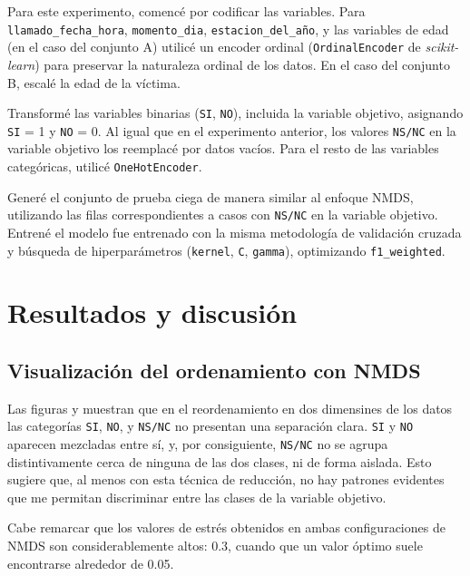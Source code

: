 \documentclass[10 pt]{article}
\begin{document}
Para este experimento, comencé por codificar las variables. Para \texttt{llamado\_fecha\_hora}, \texttt{momento\_dia}, \texttt{estacion\_del\_año}, y las variables de edad (en el caso del conjunto A) utilicé un encoder ordinal (\texttt{OrdinalEncoder} de \textit{scikit-learn}\citetext{\citealp{scikit-learn}}) para preservar la naturaleza ordinal de los datos. En el caso del conjunto B, escalé la edad de la víctima.

Transformé las variables binarias (\texttt{SI}, \texttt{NO}), incluida la variable objetivo, asignando \texttt{SI} = 1 y \texttt{NO} = 0. Al igual que en el experimento anterior, los valores \texttt{NS/NC} en la variable objetivo los reemplacé por datos vacíos. Para el resto de las variables categóricas, utilicé \texttt{OneHotEncoder}.

Generé el conjunto de prueba ciega  de manera similar al enfoque NMDS, utilizando las filas correspondientes a casos con \texttt{NS/NC} en la variable objetivo. Entrené el modelo fue entrenado con la misma metodología de validación cruzada y búsqueda de hiperparámetros (\texttt{kernel}, \texttt{C}, \texttt{gamma}), optimizando \texttt{f1\_weighted}.


\section{Resultados y discusión}\label{resultados}

\subsection{Visualización del ordenamiento con NMDS}

Las figuras  y  muestran que en el reordenamiento en dos dimensines de los datos las categorías \texttt{SI}, \texttt{NO}, y \texttt{NS/NC} no presentan una separación clara. \texttt{SI} y \texttt{NO} aparecen mezcladas entre sí, y, por consiguiente, \texttt{NS/NC} no se agrupa distintivamente cerca de ninguna de las dos clases, ni de forma aislada. Esto sugiere que, al menos con esta técnica de reducción, no hay patrones evidentes que me permitan discriminar entre las clases de la variable objetivo.

Cabe remarcar que los valores de estrés obtenidos en ambas configuraciones de NMDS son considerablemente altos: 0.3, cuando que un valor óptimo suele encontrarse alrededor de 0.05. 
\end{document}

